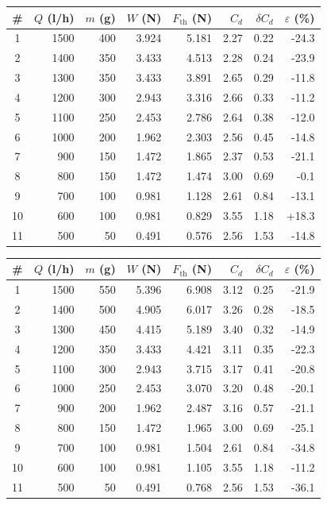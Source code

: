 \begin{tabular}{c r r r r r r r}
\toprule
\# & {$Q$ (l/h)} & {$m$ (g)} & {$W$ (N)} & {$F_{\mathrm{th}}$ (N)} & {$C_d$} & {$\delta C_d$} & {$\varepsilon$ (\%)} \\
\midrule
1 & 1500 & 400 & 3.924 & 5.181 & 2.27 & 0.22 & -24.3 \\
2 & 1400 & 350 & 3.433 & 4.513 & 2.28 & 0.24 & -23.9 \\
3 & 1300 & 350 & 3.433 & 3.891 & 2.65 & 0.29 & -11.8 \\
4 & 1200 & 300 & 2.943 & 3.316 & 2.66 & 0.33 & -11.2 \\
5 & 1100 & 250 & 2.453 & 2.786 & 2.64 & 0.38 & -12.0 \\
6 & 1000 & 200 & 1.962 & 2.303 & 2.56 & 0.45 & -14.8 \\
7 & 900 & 150 & 1.472 & 1.865 & 2.37 & 0.53 & -21.1 \\
8 & 800 & 150 & 1.472 & 1.474 & 3.00 & 0.69 & -0.1 \\
9 & 700 & 100 & 0.981 & 1.128 & 2.61 & 0.84 & -13.1 \\
10 & 600 & 100 & 0.981 & 0.829 & 3.55 & 1.18 & +18.3 \\
11 & 500 & 50 & 0.491 & 0.576 & 2.56 & 1.53 & -14.8 \\
\bottomrule
\end{tabular}

\begin{tabular}{c r r r r r r r}
\toprule
\# & {$Q$ (l/h)} & {$m$ (g)} & {$W$ (N)} & {$F_{\mathrm{th}}$ (N)} & {$C_d$} & {$\delta C_d$} & {$\varepsilon$ (\%)} \\
\midrule
1 & 1500 & 550 & 5.396 & 6.908 & 3.12 & 0.25 & -21.9 \\
2 & 1400 & 500 & 4.905 & 6.017 & 3.26 & 0.28 & -18.5 \\
3 & 1300 & 450 & 4.415 & 5.189 & 3.40 & 0.32 & -14.9 \\
4 & 1200 & 350 & 3.433 & 4.421 & 3.11 & 0.35 & -22.3 \\
5 & 1100 & 300 & 2.943 & 3.715 & 3.17 & 0.41 & -20.8 \\
6 & 1000 & 250 & 2.453 & 3.070 & 3.20 & 0.48 & -20.1 \\
7 & 900 & 200 & 1.962 & 2.487 & 3.16 & 0.57 & -21.1 \\
8 & 800 & 150 & 1.472 & 1.965 & 3.00 & 0.69 & -25.1 \\
9 & 700 & 100 & 0.981 & 1.504 & 2.61 & 0.84 & -34.8 \\
10 & 600 & 100 & 0.981 & 1.105 & 3.55 & 1.18 & -11.2 \\
11 & 500 & 50 & 0.491 & 0.768 & 2.56 & 1.53 & -36.1 \\
\bottomrule
\end{tabular}

